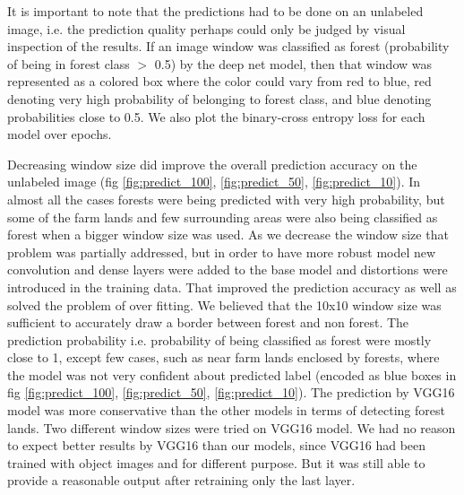 \documentclass{sigkddExp}
\begin{document}
It is important to note that the predictions had to be done on an unlabeled image, i.e. the prediction quality perhaps could only be judged by visual inspection of the results. If an image window was classified as forest (probability of being in forest class $>$ 0.5) by the deep net model, then that window was represented as a colored box where the color could vary from red to blue, red denoting very high probability of belonging to forest class, and blue denoting  probabilities close to 0.5. We also plot the binary-cross entropy loss for each model over epochs. 

Decreasing window size did improve the overall prediction accuracy on the unlabeled image (fig \ref{fig:predict_100}, \ref{fig:predict_50}, \ref{fig:predict_10}). In almost all the cases forests were being predicted with very high probability, but some of the farm lands and few surrounding areas were also being classified as forest when a bigger window size was used. As we decrease the window size that problem was partially addressed, but in order to have more robust model new convolution and dense layers were added to the base model and distortions were introduced in the training data. That improved the prediction accuracy as well as solved the problem of over fitting. We believed that the 10x10 window size was sufficient to accurately draw a border between forest and non forest. The prediction probability i.e. probability of being classified as forest were mostly close to 1, except few cases, such as near farm lands enclosed by forests, where the model was not very confident about predicted label (encoded as blue boxes in fig \ref{fig:predict_100}, \ref{fig:predict_50}, \ref{fig:predict_10}). The prediction by VGG16 model was more conservative than the other models in terms of detecting forest lands. Two different window sizes were tried on VGG16 model. We had no reason to expect better results by VGG16 than our models, since VGG16 had been trained with object images and for different purpose. But it was still able to provide a reasonable output after retraining only the last layer.
\end{document}
